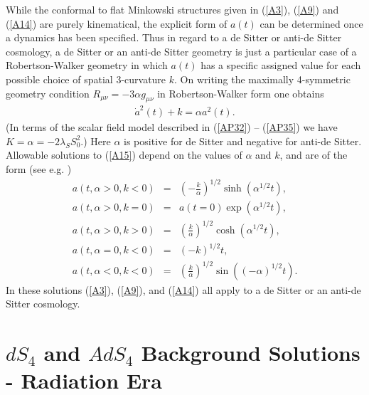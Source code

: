 While the conformal to flat Minkowski structures given in (\ref{A3}), (\ref{A9}) and (\ref{A14}) are purely kinematical, the explicit form of $a(t)$ can be determined once a dynamics has been specified. Thus in regard to a de Sitter or anti-de Sitter cosmology, a de Sitter or an anti-de Sitter geometry is  just a particular case of a Robertson-Walker geometry in which $a(t)$ has a specific assigned value for each possible choice of  spatial 3-curvature $k$. On writing the  maximally 4-symmetric geometry condition $R_{\mu\nu}=-3\alpha g_{\mu\nu}$ in Robertson-Walker form one obtains 
%
\begin{eqnarray} 
\dot{a}^2(t) +k=\alpha  a^2(t).
\label{A15}
\end{eqnarray}
%
(In terms of the scalar field model described in (\ref{AP32}) -- (\ref{AP35}) we have $K=\alpha =-2\lambda_{S}S^2_0$.) Here $\alpha$ is positive for de Sitter and negative for anti-de Sitter. Allowable solutions to (\ref{A15}) depend on the values of $\alpha$ and $k$, and are of the form (see e.g. \cite{mannheim_2006})
%
\begin{eqnarray}
a(t,\alpha>0,k<0)&=&\left(-\frac{k}{\alpha}\right)^{1/2}
\sinh(\alpha^{1/2}t),
\nonumber \\
a(t,\alpha>0,k=0)&=&a(t=0)\exp(\alpha^{1/2}t),
\nonumber \\
a(t,\alpha>0,k>0)&=&\left(\frac{k}{\alpha}\right)^{1/2}\cosh(\alpha^{1/2}t),
\nonumber \\
a(t,\alpha=0,k<0)&=&(-k)^{1/2}t,
\nonumber \\
a(t,\alpha<0,k<0)&=&\left(\frac{k}{\alpha}\right)^{1/2}\sin((-\alpha)^{1/2}t).
\label{A16}
\end{eqnarray}
%
In these solutions (\ref{A3}), (\ref{A9}), and (\ref{A14}) all apply  to a de Sitter or an anti-de Sitter cosmology.

\section{$dS_4$ and $AdS_4$ Background Solutions - Radiation Era}
\label{abs:ds4_ads4_radiation}

